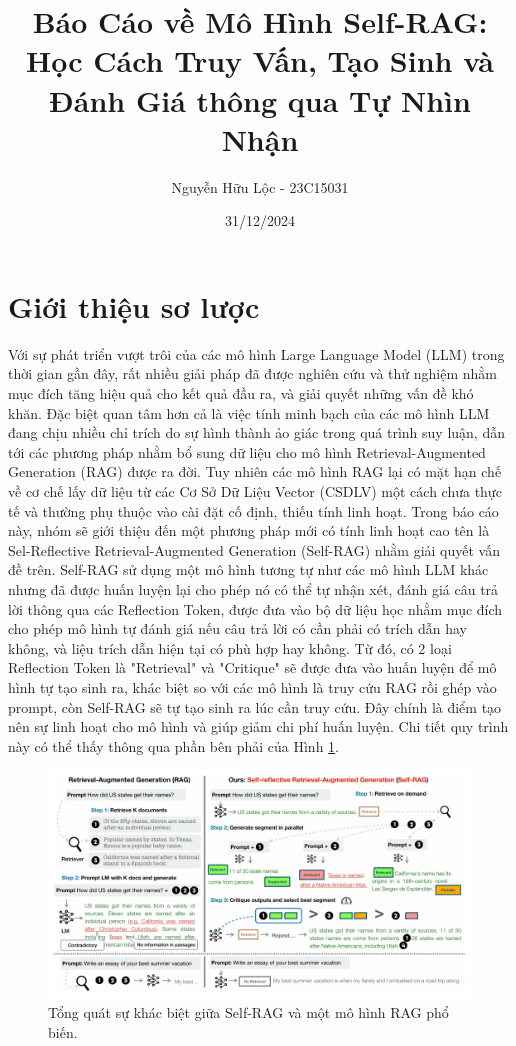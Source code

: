 \documentclass{article}
\title{Báo Cáo về Mô Hình Self-RAG: Học Cách Truy Vấn, Tạo Sinh và Đánh Giá thông qua Tự Nhìn Nhận}
\author{Nguyễn Hữu Lộc - 23C15031}
\date{31/12/2024}
\begin{document}
\maketitle

\tableofcontents


\section{Giới thiệu sơ lược}
Với sự phát triển vượt trôi của các mô hình Large Language Model (LLM) trong thời gian gần đây, rất nhiều giải pháp đã được nghiên cứu và thử nghiệm nhằm mục đích tăng hiệu quả cho kết quả đầu ra, và giải quyết những vấn đề khó khăn. Đặc biệt quan tâm hơn cả là việc tính minh bạch của các mô hình LLM đang chịu nhiều chỉ trích do sự hình thành ảo giác trong quá trình suy luận, dẫn tới các phương pháp nhằm bổ sung dữ liệu cho mô hình Retrieval-Augmented Generation (RAG) được ra đời. Tuy nhiên các mô hình RAG lại có mặt hạn chế về cơ chế lấy dữ liệu từ các Cơ Sở Dữ Liệu Vector (CSDLV) một cách chưa thực tế và thường phụ thuộc vào cài đặt cố định, thiếu tính linh hoạt. Trong báo cáo này, nhóm sẽ giới thiệu đến một phương pháp mới có tính linh hoạt cao tên là Sel-Reflective Retrieval-Augmented Generation (Self-RAG) nhằm giải quyết vấn đề trên. Self-RAG sử dụng một mô hình tương tự như các mô hình LLM khác nhưng đã được huấn luyện lại cho phép nó có thể tự nhận xét, đánh giá câu trả lời thông qua các Reflection Token, được đưa vào bộ dữ liệu học nhằm mục đích cho phép mô hình tự đánh giá nếu câu trả lời có cần phải có trích dẫn hay không, và liệu trích dẫn hiện tại có phù hợp hay không. Từ đó, có 2 loại Reflection Token là "Retrieval" và "Critique" sẽ được đưa vào huấn luyện để mô hình tự tạo sinh ra, khác biệt so với các mô hình là truy cứu RAG rồi ghép vào prompt, còn Self-RAG sẽ tự tạo sinh ra lúc cần truy cứu. Đây chính là điểm tạo nên sự linh hoạt cho mô hình và giúp giảm chi phí huấn luyện. Chi tiết quy trình này có thể thấy thông qua phần bên phải của Hình \ref{fig:overview_self_rag}.

\begin{figure} 
    \centering
    \includegraphics[scale = 0.2]{overview_self_rag.jpeg}
    \caption{Tổng quát sự khác biệt giữa Self-RAG và một mô hình RAG phổ biến.}
    \label{fig:overview_self_rag}
\end{figure}
\end{document}
